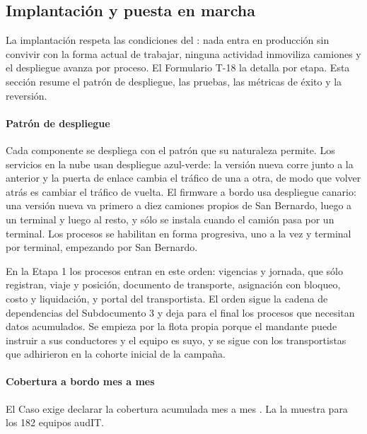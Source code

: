 \subsection{Implantación y puesta en marcha}\label{sec:7-implantacion}

La implantación respeta las condiciones del : nada entra en producción sin
convivir con la forma actual de trabajar, ninguna actividad inmoviliza camiones y el despliegue avanza
por proceso. El Formulario T-18 la detalla por etapa. Esta sección resume el patrón de despliegue, las
pruebas, las métricas de éxito y la reversión.

\paragraph{Patrón de despliegue}
Cada componente se despliega con el patrón que su naturaleza permite. Los servicios en la nube usan
despliegue azul-verde: la versión nueva corre junto a la anterior y la puerta de enlace cambia el tráfico
de una a otra, de modo que volver atrás es cambiar el tráfico de vuelta. El firmware a bordo usa
despliegue canario: una versión nueva va primero a diez camiones propios de San Bernardo, luego a un
terminal y luego al resto, y sólo se instala cuando el camión pasa por un terminal. Los procesos se
habilitan en forma progresiva, uno a la vez y terminal por terminal, empezando por San Bernardo.

En la Etapa 1 los procesos entran en este orden: vigencias y jornada, que sólo registran, viaje y
posición, documento de transporte, asignación con bloqueo, costo y liquidación, y portal del
transportista. El orden sigue la cadena de dependencias del Subdocumento 3 y deja para el final los
procesos que necesitan datos acumulados. Se empieza por la flota propia porque el mandante puede
instruir a sus conductores y el equipo es suyo, y se sigue con los transportistas que adhirieron en la
cohorte inicial de la campaña.

\paragraph{Cobertura a bordo mes a mes}
El Caso exige declarar la cobertura acumulada mes a mes . La
 la muestra para los 182 equipos audIT.


